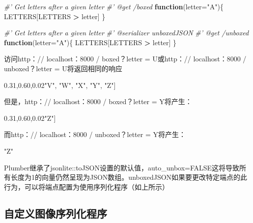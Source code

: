 \documentclass[]{book}
\newenvironment{Shaded}{\begin{snugshade}}{\end{snugshade}}
\newcommand{\DataTypeTok}[1]{\textcolor[rgb]{0.13,0.29,0.53}{#1}}
\newcommand{\StringTok}[1]{\textcolor[rgb]{0.31,0.60,0.02}{#1}}
\newcommand{\CommentTok}[1]{\textcolor[rgb]{0.56,0.35,0.01}{\textit{#1}}}
\newcommand{\ControlFlowTok}[1]{\textcolor[rgb]{0.13,0.29,0.53}{\textbf{#1}}}
\newcommand{\OperatorTok}[1]{\textcolor[rgb]{0.81,0.36,0.00}{\textbf{#1}}}
\newcommand{\NormalTok}[1]{#1}
\begin{document}
\begin{Shaded}
\begin{Highlighting}[]
\CommentTok{#' Get letters after a given letter}
\CommentTok{#' @get /boxed}
\ControlFlowTok{function}\NormalTok{(}\DataTypeTok{letter=}\StringTok{"A"}\NormalTok{)\{}
\NormalTok{  LETTERS[LETTERS }\OperatorTok{>}\StringTok{ }\NormalTok{letter]}
\NormalTok{\}}

\CommentTok{#' Get letters after a given letter}
\CommentTok{#' @serializer unboxedJSON}
\CommentTok{#' @get /unboxed}
\ControlFlowTok{function}\NormalTok{(}\DataTypeTok{letter=}\StringTok{"A"}\NormalTok{)\{}
\NormalTok{  LETTERS[LETTERS }\OperatorTok{>}\StringTok{ }\NormalTok{letter]}
\NormalTok{\}}
\end{Highlighting}
\end{Shaded}

访问http：// localhost：8000 / boxed？letter = U或http：//
localhost：8000 / unboxed？letter = U将返回相同的响应

\begin{Shaded}
\begin{Highlighting}[]
\NormalTok{[}\StringTok{"V"}\NormalTok{, }\StringTok{"W"}\NormalTok{, }\StringTok{"X"}\NormalTok{, }\StringTok{"Y"}\NormalTok{, }\StringTok{"Z"}\NormalTok{]}
\end{Highlighting}
\end{Shaded}

但是，http：// localhost：8000 / boxed？letter = Y将产生：

\begin{Shaded}
\begin{Highlighting}[]
\NormalTok{[}\StringTok{"Z"}\NormalTok{]}
\end{Highlighting}
\end{Shaded}

而http：// localhost：8000 / unboxed？letter = Y将产生：

\begin{Shaded}
\begin{Highlighting}[]
\StringTok{"Z"}
\end{Highlighting}
\end{Shaded}

Plumber继承了jsonlite::toJSON设置的默认值，auto\_unbox=FALSE这将导致所有长度为1的向量仍然呈现为JSON数组。unboxedJSON如果要更改特定端点的此行为，可以将端点配置为使用序列化程序（如上所示）

\subsection{自定义图像序列化程序}
\end{document}

